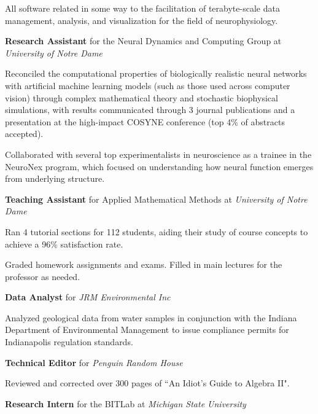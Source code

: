 \begin{rubric}{}
\begin{cvitems}
\item All software related in some way to the facilitation of terabyte-scale data management, analysis, and visualization for the field of neurophysiology.
\end{cvitems}
%
%
%
\entry*[2016 -- 2020]
    \textbf{Research Assistant} for the Neural Dynamics and Computing Group at \emph{University of Notre Dame}
\begin{cvitems}
\item Reconciled the computational properties of biologically realistic neural networks with artificial machine learning models (such as those used across computer vision) through complex mathematical theory and stochastic biophysical simulations, with results communicated through 3 journal publications and a presentation at the high-impact COSYNE conference (top 4\% of abstracts accepted).
\item Collaborated with several top experimentalists in neuroscience as a trainee in the NeuroNex program, which focused on understanding how neural function emerges from underlying structure.
\end{cvitems}
%
%
%
\entry*[2015 -- 2017]
    \textbf{Teaching Assistant} for Applied Mathematical Methods at \emph{University of Notre Dame}
\begin{cvitems}
\item Ran 4 tutorial sections for 112 students, aiding their study of course concepts to achieve a 96\% satisfaction rate.
\item Graded homework assignments and exams. Filled in main lectures for the professor as needed.
\end{cvitems}
%
%
%
\entry*[2015 -- 2016]
    \textbf{Data Analyst} for \emph{JRM Environmental Inc}
\begin{cvitems}
\item Analyzed geological data from water samples in conjunction with the Indiana Department of Environmental Management to issue compliance permits for Indianapolis regulation standards.
\end{cvitems}
%
%
%
\entry*[Summer 2015]
    \textbf{Technical Editor} for \emph{Penguin Random House}
\begin{cvitems}
\item Reviewed and corrected over 300 pages of ``An Idiot's Guide to Algebra II".
\end{cvitems}
%
%
%
\entry*[Summer 2014]
    \textbf{Research Intern} for the BITLab at \emph{Michigan State University}
\begin{cvitems}

\end{cvitems}
\end{rubric}
